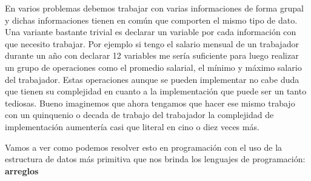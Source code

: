 En varios problemas debemos trabajar con varias informaciones de forma grupal y dichas informaciones tienen en común que comporten el mismo tipo de dato. Una variante bastante trivial es declarar un variable por cada información con que necesito trabajar. Por ejemplo si tengo el salario mensual de un trabajador durante un año con declarar 12 variables me sería suficiente para luego realizar un grupo de operaciones como el promedio salarial, el mínimo y máximo salario del trabajador. Estas operaciones aunque se pueden implementar no cabe duda que tienen su complejidad en cuanto a la implementación que puede ser un tanto tediosas. Bueno imaginemos que ahora tengamos que hacer ese mismo trabajo con un quinquenio o decada de trabajo del trabajador la complejidad de implementación aumentería casi que literal en cino o diez veces más. 

Vamos a ver como podemos resolver esto en programación con el uso de la estructura de datos más primitiva que nos brinda los lenguajes de programación: \textbf{arreglos}  